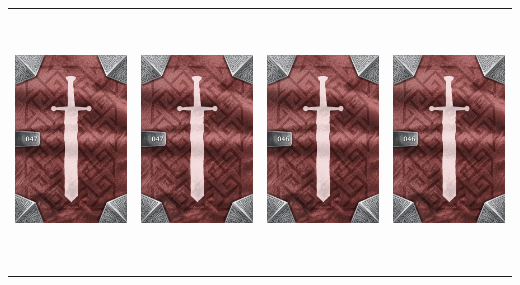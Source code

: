 \documentclass{minimal}
\begin{document}
{\begin{longtable}{llll}
\includegraphics[width=44mm,height=68mm]{./43-49/gh-047-reaping-scythe-back.png} &
\includegraphics[width=44mm,height=68mm]{./43-49/gh-047-reaping-scythe-back.png} &
\includegraphics[width=44mm,height=68mm]{./43-49/gh-046-spiked-shield-back.png} &
\includegraphics[width=44mm,height=68mm]{./43-49/gh-046-spiked-shield-back.png}\\ 

\end{longtable}}
\end{document}
